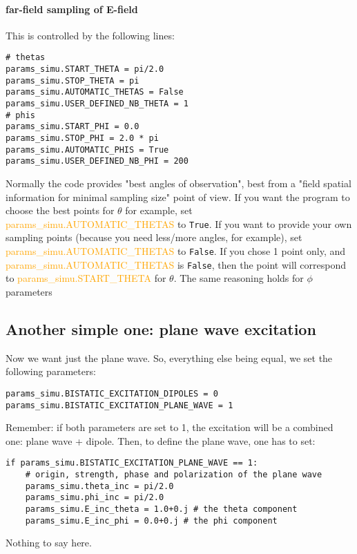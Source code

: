 \documentclass[a4paper,10pt]{book}
\newcommand{\parameter}[1] {\textcolor{orange}{\textsf{#1}}}
\begin{document}
\paragraph{far-field sampling of E-field}
%
\par
This is controlled by the following lines:
\begin{verbatim}
# thetas
params_simu.START_THETA = pi/2.0
params_simu.STOP_THETA = pi
params_simu.AUTOMATIC_THETAS = False
params_simu.USER_DEFINED_NB_THETA = 1
# phis
params_simu.START_PHI = 0.0
params_simu.STOP_PHI = 2.0 * pi
params_simu.AUTOMATIC_PHIS = True
params_simu.USER_DEFINED_NB_PHI = 200
\end{verbatim}
%
\par
Normally the code provides "best angles of observation", best from a "field spatial information for minimal sampling size" point of view. If you want the program to choose the best points for $\theta$ for example, set \parameter{params\_simu.AUTOMATIC\_THETAS} to \texttt{True}. If you want to provide your own sampling points (because you need less/more angles, for example), set \parameter{params\_simu.AUTOMATIC\_THETAS} to \texttt{False}. If you chose 1 point only, and \parameter{params\_simu.AUTOMATIC\_THETAS} is \texttt{False}, then the point will correspond to \parameter{params\_simu.START\_THETA} for $\theta$. The same reasoning holds for $\phi$ parameters

\subsection{Another simple one: plane wave excitation}
%
\par
Now we want just the plane wave. So, everything else being equal, we set the following parameters:
\begin{verbatim}
params_simu.BISTATIC_EXCITATION_DIPOLES = 0
params_simu.BISTATIC_EXCITATION_PLANE_WAVE = 1
\end{verbatim}
Remember: if both parameters are set to 1, the excitation will be a combined one: plane wave + dipole. Then, to define the plane wave, one has to set:
\begin{verbatim}
if params_simu.BISTATIC_EXCITATION_PLANE_WAVE == 1:
    # origin, strength, phase and polarization of the plane wave
    params_simu.theta_inc = pi/2.0
    params_simu.phi_inc = pi/2.0
    params_simu.E_inc_theta = 1.0+0.j # the theta component
    params_simu.E_inc_phi = 0.0+0.j # the phi component
\end{verbatim}
Nothing to say here.
\end{document}
